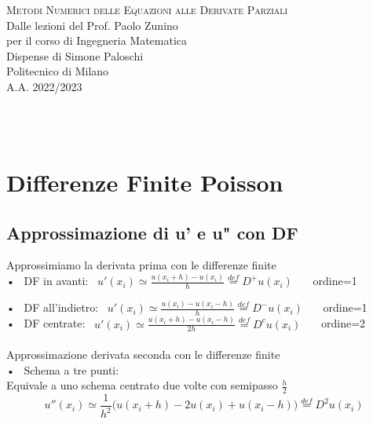 \documentclass{article}
\begin{document}
\begin{center}
	\vspace*{1cm}
	{\Huge \textsc{Metodi Numerici delle Equazioni alle Derivate Parziali}}\\
	\vspace*{1cm}
	{\large {Dalle lezioni del Prof. Paolo Zunino}}\\
	\vspace*{0.1cm}
	{\large per il corso di Ingegneria Matematica}\\
	\vspace*{0.7cm}
	{\large {Dispense di Simone Paloschi}}\\
	\vspace*{0.7cm}
	Politecnico di Milano\\
	A.A. 2022/2023
\end{center}
\phantom{}\\ \\

\begingroup
  \hypersetup{hidelinks}
  \tableofcontents
\endgroup

\pagebreak

\section{Differenze Finite Poisson}

\subsection{Approssimazione di u' e u" con DF}

Approssimiamo la derivata prima con le differenze finite\\

• \ DF in avanti: \ $u'(x_i)\simeq \frac{u(x_i+h)-u(x_i)}{h} \overset{def}{=} D^+u(x_i)$  \ \ \  ordine=1\vspace{0.5cm} 

• \ DF all'indietro: \  $u'(x_i)\simeq \frac{u(x_i)-u(x_i-h)}{h} \overset{def}{=} D^-u(x_i)$  \ \ \  ordine=1\\

• \ DF centrate: \  $u'(x_i)\simeq \frac{u(x_i+h)-u(x_i-h)}{2h} \overset{def}{=} D^c u(x_i)$ \ \ \   ordine=2\\ \\


Approssimazione derivata seconda con le differenze finite\\

• \ Schema a tre punti:\\
Equivale a uno schema centrato due volte con semipasso $\frac{h}{2}$
\[
u''(x_i)\simeq \frac{1}{h^2}\Big( u(x_i+h)-2u(x_i) +u(x_i-h) \Big) \overset{def}{=} D^2 u(x_i)
\]
\end{document}
